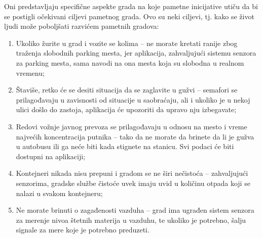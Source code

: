 \documentclass[a4paper,12pt]{article}
\begin{document}
{Oni predstavljaju specifične aspekte grada na koje pametne inicijative utiču da bi se postigli očekivani ciljevi pametnog grada. Ovo su neki ciljevi, tj. kako se život ljudi može poboljšati razvićem pametnih gradova:
\begin{enumerate}
\item Ukoliko žurite u grad i vozite se kolima – ne morate kretati ranije zbog traženja slobodnih parking mesta, jer aplikacija, zahvaljujući sistemu senzora za parking mesta, sama navodi na ona mesta koja su slobodna u realnom vremenu;
\item Štaviše, retko će se desiti situacija da se zaglavite u gužvi – semafori se prilagođavaju u zavisnosti od situacije u saobraćaju, ali i ukoliko je u nekoj ulici došlo do zastoja, aplikacija će  upozoriti da upravo nju izbegavate;
\item Redovi vožnje javnog prevoza se prilagođavaju u odnosu na mesto i vreme najvećih koncentracija putnika – tako da ne morate da brinete da li je gužva u autobusu ili ga neće biti kada stignete na stanicu. Svi podaci će biti dostupni na aplikaciji;
\item Kontejneri nikada nisu prepuni i gradom se ne širi nečistoća – zahvaljujući senzorima, gradske službe čistoće uvek imaju uvid u količinu otpada koji se nalazi u svakom kontejneru;
\item Ne morate brinuti o zagađenosti vazduha – grad ima ugrađen sistem senzora za merenje nivoa štetnih materija u vazduhu, te ukoliko je potrebno, šalju signale za mere koje je potrebno preduzeti.
\end{enumerate}
 \\



}
\end{document}
